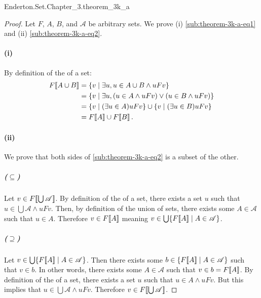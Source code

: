 \documentclass{report}
\begin{document}
    {Enderton.Set.Chapter\_3.theorem\_3k\_a}

  \begin{proof}
    Let $F$, $A$, $B$, and $\mathscr{A}$ be arbitrary sets.
    We prove (i) \eqref{sub:theorem-3k-a-eq1} and (ii)
      \eqref{sub:theorem-3k-a-eq2}.

    \paragraph{(i)}%

      By definition of the  of a set:
        \begin{align*}
          F\!\left\llbracket A \cup B\right\rrbracket
            & = \{v \mid \exists u, u \in A \cup B \land uFv\} \\
            & = \{v \mid \exists u,
              (u \in A \land uFv) \lor (u \in B \land uFv)\} \\
            & = \{v \mid (\exists u \in A) uFv\} \cup
              \{v \mid (\exists u \in B) uFv\} \\
            & = F\!\left\llbracket A\right\rrbracket \cup F\!\left\llbracket B\right\rrbracket.
        \end{align*}

    \paragraph{(ii)}%

      We prove that both sides of \eqref{sub:theorem-3k-a-eq2} is a subset of
        the other.

      \subparagraph{($\subseteq$)}%

        Let $v \in F\!\left\llbracket\bigcup{\mathscr{A}}\right\rrbracket$.
        By definition of the  of a set, there exists a set
          $u$ such that $u \in \bigcup{\mathscr{A}} \land uFv$.
        Then, by definition of the union of sets, there exists some
          $A \in \mathscr{A}$ such that $u \in A$.
        Therefore $v \in F\!\left\llbracket A\right\rrbracket$ meaning
          $v \in \bigcup\{F\!\left\llbracket A\right\rrbracket \mid A \in \mathscr{A}\}$.

      \subparagraph{($\supseteq$)}%

        Let $v \in \bigcup\{F\!\left\llbracket A\right\rrbracket \mid A \in \mathscr{A}\}$.
        Then there exists some $b \in \{F\!\left\llbracket A\right\rrbracket \mid A \in \mathscr{A}\}$
          such that $v \in b$.
        In other words, there exists some $A \in \mathscr{A}$ such that
          $v \in b = F\!\left\llbracket A\right\rrbracket$.
        By definition of the  of a set, there exists a set
          $u$ such that $u \in A \land uFv$.
        But this implies that $u \in \bigcup{\mathscr{A}} \land uFv$.
        Therefore $v \in F\!\left\llbracket\bigcup{\mathscr{A}}\right\rrbracket$.

  \end{proof}
\end{document}
